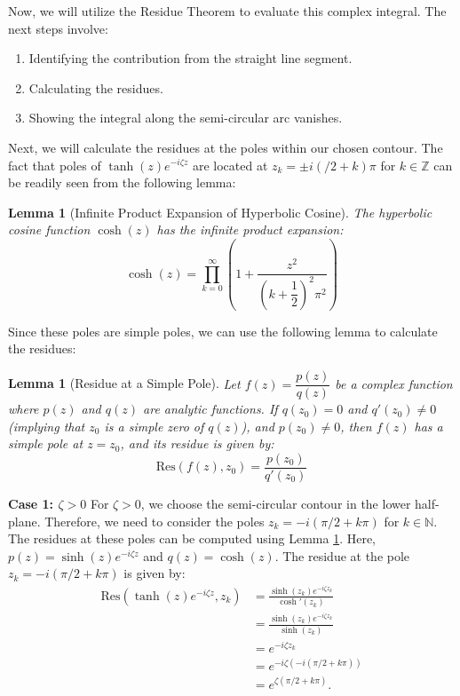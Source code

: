 \documentclass[a4paper,12pt]{article}
\newtheorem{lem}[thm]{Lemma}
\newcommand{\z}{\zeta}
\begin{document}
\bigskip

Now, we will utilize the Residue Theorem to evaluate this complex integral. 
The next steps involve:

\begin{enumerate}
  \item Identifying the contribution from the straight line segment.
  \item Calculating the residues.
  \item Showing the integral along the semi-circular arc vanishes.
\end{enumerate}

Next, we will calculate the residues at the poles within our chosen contour. The fact that poles of $\tanh(z)e^{-i\zeta z}$ are located at $z_k = \pm i (/2 + k)\pi$ for $k \in \mathbb{Z}$ can be readily seen from the following lemma:

\begin{lem}[Infinite Product Expansion of Hyperbolic Cosine]
The hyperbolic cosine function $\cosh(z)$ has the infinite product expansion:
$$ \cosh(z) = \prod_{k=0}^{\infty} \left(1 + \frac{z^2}{\left(k+\dfrac{1}{2}\right)^2\pi^2}\right) $$
\end{lem}

Since these poles are simple poles, we can use the following lemma to calculate the residues:

\begin{lem}[Residue at a Simple Pole] \label{lem:simple_pole_res}
Let $f(z) = \dfrac{p(z)}{q(z)}$ be a complex function where $p(z)$ and $q(z)$ are analytic functions. If $q(z_0) = 0$ and $q'(z_0) \neq 0$ (implying that $z_0$ is a simple zero of $q(z)$), and $p(z_0) \neq 0$, then $f(z)$ has a simple pole at $z=z_0$, and its residue is given by:
$$ \text{Res}(f(z), z_0) = \frac{p(z_0)}{q'(z_0)} $$
\end{lem}

\textbf{Case 1: $\zeta > 0$}
For $\z > 0$, we choose the semi-circular contour in the lower half-plane. Therefore, we need to consider the poles $z_k = -i (\pi/2 + k\pi)$ for $k \in \mathbb{N}$.
The residues at these poles can be computed using Lemma \ref{lem:simple_pole_res}. Here, $p(z) = \sinh(z)e^{-i \z z}$ and $q(z) = \cosh(z)$.
The residue at the pole $z_k = -i (\pi/2 + k\pi)$ is given by:
\begin{align*}
  \text{Res}(\tanh(z)e^{-i \z z}, z_k) &= \frac{\sinh(z_k)e^{-i \z z_k}}{\cosh'(z_k)} \\
  &=\frac{\sinh(z_k)e^{-i \z z_k}}{\sinh(z_k)}\\
  &= e^{-i \z z_k} \\
  &= e^{-i \z (-i (\pi/2 + k\pi))}\\
  &= e^{\z (\pi/2 + k\pi)}.
\end{align*}
\end{document}
